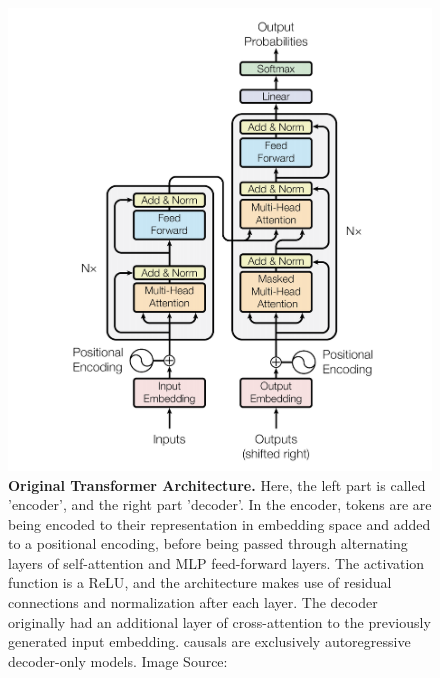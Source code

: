 \begin{figure}[!htb]
    \begin{centering}
        \includegraphics[height=0.5\textheight]{img/transformer}
        \caption[Original Transformer Architecture]{\textbf{Original Transformer Architecture.}
        Here, the left part is called 'encoder', and the right part 'decoder'.
        In the encoder, tokens are are being encoded to their representation in embedding space and added to a positional encoding, before being passed through alternating layers of self-attention and \gls{MLP} feed-forward layers.
        The activation function is a \gls{ReLU}, and the architecture makes use of residual connections and normalization after each layer.
        The decoder originally had an additional layer of cross-attention to the previously generated input embedding.
        \Glspl{causal} are exclusively autoregressive decoder-only models.
        Image Source: \cite{vaswani_attention_2017}
        }
        \label{fig:transformer}
    \end{centering}
\end{figure}

